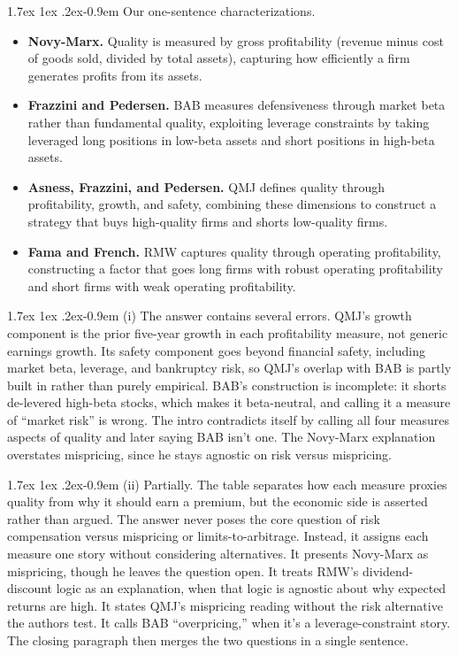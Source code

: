 \documentclass[11pt]{article}
\makeatletter
\renewcommand\paragraph{\@startsection{paragraph}{4}{0pt}%
  {1.7ex \@plus 1ex \@minus .2ex}{-0.9em}%
  {\normalfont\bfseries\normalsize\color{psink}}}
\newenvironment{tight}
  {\begin{itemize}\setlength{\itemsep}{3pt}\setlength{\parskip}{0pt}%
   \setlength{\topsep}{3pt}\setlength{\leftmargini}{1.4em}}
  {\end{itemize}}
\makeatother
\begin{document}
\paragraph{Our one-sentence characterizations.}
\begin{tight}
  \item \textbf{Novy-Marx.} Quality is measured by gross profitability (revenue minus cost of goods sold, divided by total assets), capturing how efficiently a firm generates profits from its assets.
  \item \textbf{Frazzini and Pedersen.} BAB measures defensiveness through market beta rather than fundamental quality, exploiting leverage constraints by taking leveraged long positions in low-beta assets and short positions in high-beta assets.
  \item \textbf{Asness, Frazzini, and Pedersen.} QMJ defines quality through profitability, growth, and safety, combining these dimensions to construct a strategy that buys high-quality firms and shorts low-quality firms.
  \item \textbf{Fama and French.} RMW captures quality through operating profitability, constructing a factor that goes long firms with robust operating profitability and short firms with weak operating profitability.
\end{tight}

\paragraph{(i)}
The answer contains several errors. QMJ's growth component is the prior five-year growth in each profitability measure, not generic earnings growth. Its safety component goes beyond financial safety, including market beta, leverage, and bankruptcy risk, so QMJ's overlap with BAB is partly built in rather than purely empirical. BAB's construction is incomplete: it shorts de-levered high-beta stocks, which makes it beta-neutral, and calling it a measure of ``market risk'' is wrong. The intro contradicts itself by calling all four measures aspects of quality and later saying BAB isn't one. The Novy-Marx explanation overstates mispricing, since he stays agnostic on risk versus mispricing.

\paragraph{(ii)}
Partially. The table separates how each measure proxies quality from why it should earn a premium, but the economic side is asserted rather than argued. The answer never poses the core question of risk compensation versus mispricing or limits-to-arbitrage. Instead, it assigns each measure one story without considering alternatives. It presents Novy-Marx as mispricing, though he leaves the question open. It treats RMW's dividend-discount logic as an explanation, when that logic is agnostic about why expected returns are high. It states QMJ's mispricing reading without the risk alternative the authors test. It calls BAB ``overpricing,'' when it's a leverage-constraint story. The closing paragraph then merges the two questions in a single sentence.
\end{document}
